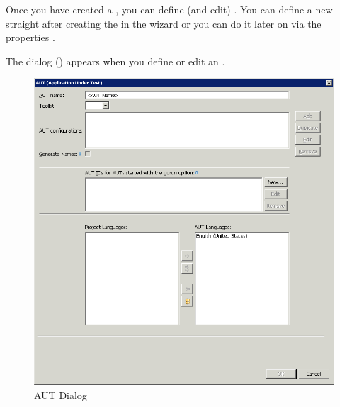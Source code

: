 



Once you have created a \gdproject{}, you can define (and edit) \gdauts{}. 
You can define a new \gdaut{} straight after creating the \gdproject{} in the \gdproject{} wizard or you can do it later on via the \gdproject{} properties . 


The \gdaut{} dialog () appears when you define or edit an \gdaut{}. 

\begin{figure}[h]
\begin{center}
\includegraphics[width=12.5cm]{Tasks/AUTs/PS/autdialog}
\caption{AUT Dialog}
\label{autdialog}
\end{center}
\end{figure}


